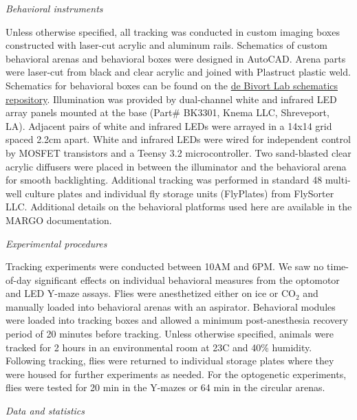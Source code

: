 \documentclass[10pt]{article}
\begin{document}
\begin{multicols}{2}
\vspace*{0.5cm}
\noindent\textit{Behavioral instruments}
\vspace*{0.3cm}

Unless otherwise specified, all tracking was conducted in custom imaging boxes constructed with laser-cut acrylic and aluminum rails. Schematics of custom behavioral arenas and behavioral boxes were designed in AutoCAD. Arena parts were laser-cut from black and clear acrylic and joined with Plastruct plastic weld. Schematics for behavioral boxes can be found on the \href{https://github.com/de-Bivort-Lab/dblab-schematics}{de Bivort Lab schematics repository}. Illumination was provided by dual-channel white and infrared LED array panels mounted at the base (Part# BK3301, Knema LLC, Shreveport, LA). Adjacent pairs of white and infrared LEDs were arrayed in a 14x14 grid spaced 2.2cm apart. White and infrared LEDs were wired for independent control by MOSFET transistors and a Teensy 3.2 microcontroller. Two sand-blasted clear acrylic diffusers were placed in between the illuminator and the behavioral arena for smooth backlighting. Additional tracking was performed in standard 48 multi-well culture plates and individual fly storage units (FlyPlates) from FlySorter LLC. Additional details on the behavioral platforms used here are available in the MARGO documentation.

\vspace*{0.5cm}
\noindent\textit{Experimental procedures}
\vspace*{0.3cm}

Tracking experiments were conducted between 10AM and 6PM. We saw no time-of-day significant effects on individual behavioral measures from the optomotor and LED Y-maze assays. Flies were anesthetized either on ice or CO$_{2}$ and manually loaded into behavioral arenas with an aspirator. Behavioral modules were loaded into tracking boxes and allowed a minimum post-anesthesia recovery period of 20 minutes before tracking. Unless otherwise specified, animals were tracked for 2 hours in an environmental room at 23\degree C and 40\% humidity. Following tracking, flies were returned to individual storage plates where they were housed for further experiments as needed. For the optogenetic experiments, flies were tested for 20 min in the Y-mazes or 64 min in the circular arenas.

\vspace*{0.5cm}
\noindent\textit{Data and statistics}
\vspace*{0.3cm}


\end{multicols}
\end{document}
